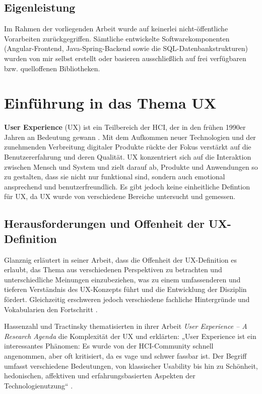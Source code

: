 \documentclass[12pt,oneside]{article}
\begin{document}
\subsection{Eigenleistung}
Im Rahmen der vorliegenden Arbeit wurde auf keinerlei nicht-öffentliche Vorarbeiten zurückgegriffen. Sämtliche entwickelte Softwarekomponenten (Angular-Frontend, Java-Spring-Backend sowie die SQL-Datenbankstrukturen) wurden von mir selbst erstellt oder basieren ausschließlich auf frei verfügbaren bzw. quelloffenen Bibliotheken.

\section{Einführung in das Thema UX}

\textbf{User Experience} (UX) ist ein Teilbereich der HCI, der in den frühen 1990er Jahren an Bedeutung gewann \cite{glanznig}. Mit dem Aufkommen neuer Technologien und der zunehmenden Verbreitung digitaler Produkte rückte der Fokus verstärkt auf die Benutzererfahrung und deren Qualität. UX konzentriert sich auf die Interaktion zwischen Mensch und System und zielt darauf ab, Produkte und Anwendungen so zu gestalten, dass sie nicht nur funktional sind, sondern auch emotional ansprechend und benutzerfreundlich.
Es gibt jedoch keine einheitliche Defintion für UX, da UX wurde von verschiedene Bereiche untersucht und gemessen.
\subsection{Herausforderungen und Offenheit der UX-Definition}

Glanznig erläutert in seiner Arbeit, dass die Offenheit der UX-Definition  es erlaubt, das Thema aus verschiedenen Perspektiven zu betrachten und unterschiedliche Meinungen einzubeziehen, was zu einem umfassenderen und tieferen Verständnis des UX-Konzepts führt und die Entwicklung der Disziplin fördert. Gleichzeitig erschweren jedoch verschiedene fachliche Hintergründe und Vokabularien den Fortschritt \cite{glanznig}.

Hassenzahl und Tractinsky thematisierten in ihrer Arbeit \textit{User Experience – A Research Agenda} die Komplexität der UX und erklärten: „User Experience ist ein interessantes Phänomen: Es wurde von der HCI-Community schnell angenommen, aber oft kritisiert, da es vage und schwer fassbar ist. Der Begriff umfasst verschiedene Bedeutungen, von klassischer Usability bis hin zu Schönheit, hedonischen, affektiven und erfahrungsbasierten Aspekten der Technologienutzung“ \cite{research}.
\end{document}
